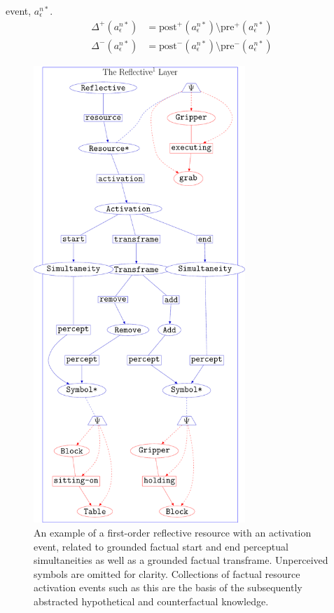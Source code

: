 event, $a^{n*}_\epsilon$.
\begin{align}
\label{equation:define_delta_first}
       \Delta^{+}(a^{n*}_\epsilon) &= \text{post}^{+}(a^{n*}_\epsilon) \setminus \text{pre}^{+}(a^{n*}_\epsilon) \\
\label{equation:define_delta_last}
       \Delta^{-}(a^{n*}_\epsilon) &= \text{post}^{-}(a^{n*}_\epsilon) \setminus \text{pre}^{-}(a^{n*}_\epsilon)
\end{align}
\begin{figure}
\center
\includegraphics[width=8cm]{gfx/example_resource_activation}
\caption[An example of a first-order reflective resource with an
  activation event.]{An example of a first-order reflective resource
  with an activation event, related to grounded factual start and end
  perceptual simultaneities as well as a grounded factual transframe.
  Unperceived symbols are omitted for clarity.  Collections of factual
  resource activation events such as this are the basis of the
  subsequently abstracted hypothetical and counterfactual knowledge.}
\label{figure:example_resource_activation}
\end{figure}

